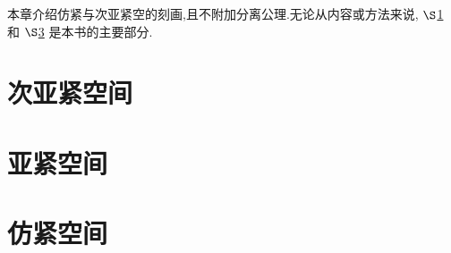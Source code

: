 \documentclass[main.tex]{subfiles}
\begin{document}
本章介绍仿紧与次亚紧空的刻画,且不附加分离公理.无论从内容或方法来说, $\S$\ref{ch2.1} 和 $\S$\ref{ch2.3} 是本书的主要部分.
\section{次亚紧空间}\label{ch2.1}

\section{亚紧空间}\label{ch2.2}

\section{仿紧空间}\label{ch2.3}
	
\end{document}
